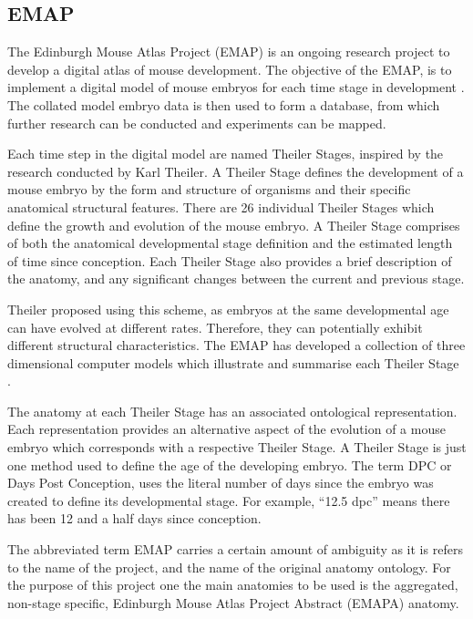 \subsection{EMAP}
The Edinburgh Mouse Atlas Project (EMAP) is an ongoing research project to develop a digital atlas of mouse development. The objective of the EMAP, is to implement a digital model of mouse embryos for each time stage in development \cite{emap}. The collated model embryo data is then used to form a database, from which further research can be conducted and experiments can be mapped.
 
Each time step in the digital model are named Theiler Stages, inspired by the research conducted by Karl Theiler. A Theiler Stage defines the development of a mouse embryo by the form and structure of organisms and their specific anatomical structural features. There are 26 individual Theiler Stages which define the growth and evolution of the mouse embryo. A Theiler Stage comprises of both the anatomical developmental stage definition and the estimated length of time since conception. Each Theiler Stage also provides a brief description of the anatomy, and any significant changes between the current and previous stage.

Theiler proposed using this scheme, as embryos at the same developmental age can have evolved at different rates. Therefore, they can potentially exhibit different structural characteristics. The EMAP has developed a collection of three dimensional computer models which illustrate and summarise each Theiler Stage \cite{emap}.

The anatomy at each Theiler Stage has an associated ontological representation. Each representation provides an alternative aspect of the evolution of a mouse embryo which corresponds with a respective Theiler Stage. A Theiler Stage is just one method used to define the age of the developing embryo. The term DPC or Days Post Conception, uses the literal number of days since the embryo was created to define its developmental stage. For example, ``12.5 dpc'' means there has been 12 and a half days since conception.

The abbreviated term EMAP carries a certain amount of ambiguity as it is refers to the name of the project, and the name of the original anatomy ontology. For the purpose of this project one the main anatomies to be used is the aggregated, non-stage specific, Edinburgh Mouse Atlas Project Abstract (EMAPA) anatomy.

